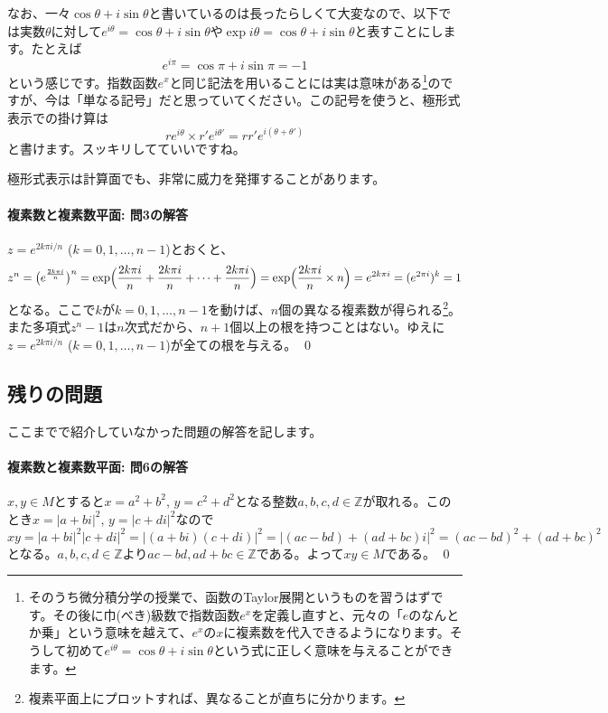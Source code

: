 なお、一々$\cos\theta+i\sin\theta$と書いているのは長ったらしくて大変なので、以下では実数$\theta$に対して$e^{i\theta} = \cos\theta + i \sin\theta$や$\exp i\theta = \cos\theta + i \sin\theta$と表すことにします。たとえば
\[
e^{i\pi} = \cos\pi + i\sin\pi = -1
\]
という感じです。指数函数$e^x$と同じ記法を用いることには実は意味がある\footnote{そのうち微分積分学の授業で、函数のTaylor展開というものを習うはずです。その後に巾(べき)級数で指数函数$e^x$を定義し直すと、元々の「$e$のなんとか乗」という意味を越えて、$e^x$の$x$に複素数を代入できるようになります。そうして初めて$e^{i\theta}=\cos\theta+i\sin\theta$という式に正しく意味を与えることができます。}のですが、今は「単なる記号」だと思っていてください。この記号を使うと、極形式表示での掛け算は
\[
re^{i\theta} \times r'e^{i\theta'} = rr'e^{i(\theta+\theta')}
\]
と書けます。スッキリしてていいですね。

極形式表示は計算面でも、非常に威力を発揮することがあります。


\paragraph{複素数と複素数平面: 問3の解答} $z=e^{2k\pi i/n}$ ($k=0,1,\ldots,n-1$)とおくと、
\[
z^n = \bigl(e^{\frac{2k\pi i}{n}}\bigr)^n = \exp\Bigl(\frac{2k\pi i}{n}+\frac{2k\pi i}{n}+\cdots+\frac{2k\pi i}{n}\Bigr) = \exp \Bigl(\frac{2k\pi i}{n} \times n\Bigr) = e^{2k\pi i} = (e^{2\pi i})^k = 1
\]
となる。ここで$k$が$k=0,1,\ldots,n-1$を動けば、$n$個の異なる複素数が得られる\footnote{複素平面上にプロットすれば、異なることが直ちに分かります。}。また多項式$z^n-1$は$n$次式だから、$n+1$個以上の根を持つことはない。ゆえに$z=e^{2k\pi i/n}$ ($k=0,1,\ldots,n-1$)が全ての根を与える。 \qed

\subsection{残りの問題}

ここまでで紹介していなかった問題の解答を記します。

\paragraph{複素数と複素数平面: 問6の解答} 

$x,y\in M$とすると$x=a^2+b^2$, $y=c^2+d^2$となる整数$a,b,c,d\in\mathbb{Z}$が取れる。このとき$x=|a+bi|^2$, $y=|c+di|^2$なので$xy=|a+bi|^2|c+di|^2=|(a+bi)(c+di)|^2=|(ac-bd)+(ad+bc)i|^2=(ac-bd)^2+(ad+bc)^2$となる。$a,b,c,d\in\mathbb{Z}$より$ac-bd,ad+bc\in\mathbb{Z}$である。よって$xy\in M$である。 \qed

